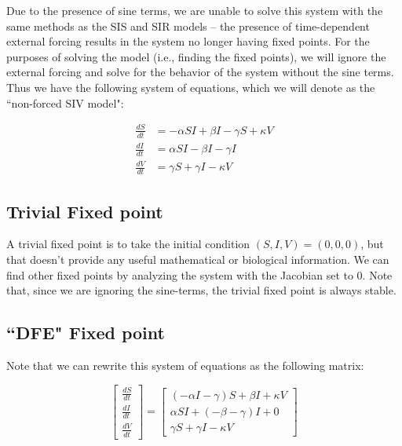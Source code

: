 \documentclass[12pt]{article}
\begin{document}
Due to the presence of sine terms, we are unable to solve this system with the same methods as the SIS and SIR models -- the presence of time-dependent external forcing results in the system no longer having fixed points. For the purposes of solving the model (i.e., finding the fixed points), we will ignore the external forcing and solve for the behavior of the system without the sine terms. Thus we have the following system of equations, which we will denote as the ``non-forced SIV model":


\begin{equation}
\begin{aligned} \label{nonForce_siv}
\frac{dS}{dt} &= -\alpha S I + \beta I - \gamma S + \kappa V\\
\frac{dI}{dt} &= \alpha S I - \beta I - \gamma I\\
\frac{dV}{dt} &= \gamma S + \gamma I - \kappa V
\end{aligned}
\end{equation}

\subsection{Trivial Fixed point}

A trivial fixed point is to take the initial condition $(S, I, V) = (0, 0, 0)$, but that doesn't provide any useful mathematical or biological information. We can find other fixed points by analyzing the system with the Jacobian set to $0$. Note that, since we are ignoring the sine-terms, the trivial fixed point is always stable.

\subsection{``DFE" Fixed point}

Note that we can rewrite this system of equations as the following matrix:

$$
\begin{bmatrix}
\frac{dS}{dt} \\
\frac{dI}{dt} \\
\frac{dV}{dt}
\end{bmatrix} =
\begin{bmatrix}
(-\alpha I - \gamma) S + \beta I + \kappa V\\
\alpha SI + (-\beta - \gamma)I + 0 \\
\gamma S + \gamma I - \kappa V
\end{bmatrix}
$$
\end{document}
